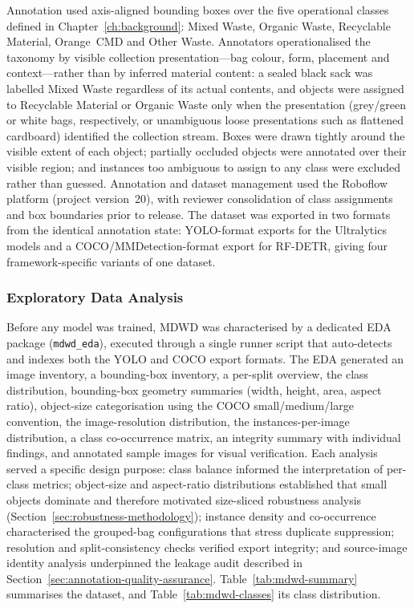 Annotation used axis-aligned bounding boxes over the five operational classes defined in Chapter~\ref{ch:background}: Mixed Waste, Organic Waste, Recyclable Material, Orange~CMD and Other Waste. Annotators operationalised the taxonomy by visible collection presentation---bag colour, form, placement and context---rather than by inferred material content: a sealed black sack was labelled Mixed Waste regardless of its actual contents, and objects were assigned to Recyclable Material or Organic Waste only when the presentation (grey/green or white bags, respectively, or unambiguous loose presentations such as flattened cardboard) identified the collection stream. Boxes were drawn tightly around the visible extent of each object; partially occluded objects were annotated over their visible region; and instances too ambiguous to assign to any class were excluded rather than guessed. Annotation and dataset management used the Roboflow platform (project version~20), with reviewer consolidation of class assignments and box boundaries prior to release. The dataset was exported in two formats from the identical annotation state: YOLO-format exports for the Ultralytics models and a COCO/MMDetection-format export for RF-DETR, giving four framework-specific variants of one dataset.

\subsubsection{Exploratory Data Analysis}

Before any model was trained, MDWD was characterised by a dedicated EDA package (\texttt{mdwd\_eda}), executed through a single runner script that auto-detects and indexes both the YOLO and COCO export formats. The EDA generated an image inventory, a bounding-box inventory, a per-split overview, the class distribution, bounding-box geometry summaries (width, height, area, aspect ratio), object-size categorisation using the COCO small/medium/large convention, the image-resolution distribution, the instances-per-image distribution, a class co-occurrence matrix, an integrity summary with individual findings, and annotated sample images for visual verification. Each analysis served a specific design purpose: class balance informed the interpretation of per-class metrics; object-size and aspect-ratio distributions established that small objects dominate and therefore motivated size-sliced robustness analysis (Section~\ref{sec:robustness-methodology}); instance density and co-occurrence characterised the grouped-bag configurations that stress duplicate suppression; resolution and split-consistency checks verified export integrity; and source-image identity analysis underpinned the leakage audit described in Section~\ref{sec:annotation-quality-assurance}. Table~\ref{tab:mdwd-summary} summarises the dataset, and Table~\ref{tab:mdwd-classes} its class distribution.

